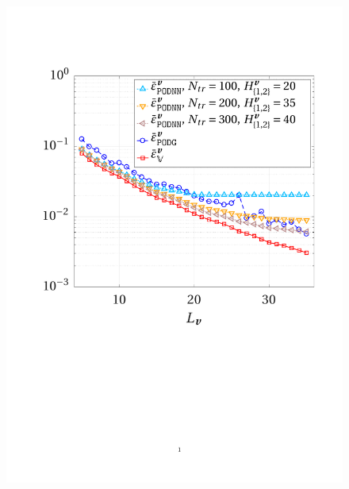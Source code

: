 \documentclass[longtitle]{elsarticle}
\numberwithin{equation}{section}
\theoremstyle{theorem}
\theoremstyle{definition}
\theoremstyle{remark}
\theoremstyle{proposition}
\numberwithin{figure}{section}
\begin{document}
\begin{figure}[t!]
			\includegraphics[scale = 0.37, trim = {2cm 9cm 1.5cm 3.5cm}, clip]{dc_400_vel_error_vs_rank} \\

\end{figure}
\end{document}
